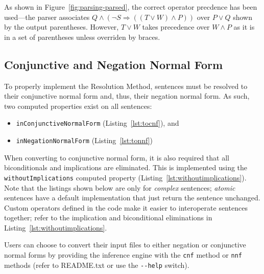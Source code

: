 As shown in Figure~\ref{fig:parsing-parsed}, the correct operator precdence has
been used---the parser associates $Q \wedge (\neg S \Rightarrow ((T \vee W) \wedge P))$
over $P \vee Q$ shown by the output parentheses. However, $T \vee W$ takes
precedence over $W \wedge P$ as it is in a set of parentheses unless overriden by braces.

\subsection{Conjunctive and Negation Normal Form}
\label{subs:CNF}

To properly implement the Resolution Method, sentences must be resolved to their
conjunctive normal form and, thus, their negation normal form. As such, two
computed properties exist on all sentences:

\begin{itemize}
  \item \texttt{inConjunctiveNormalForm} (Listing~\ref{lst:tocnf}), and
  \item \texttt{inNegationNormalForm} (Listing~\ref{lst:tonnf})
\end{itemize}

When converting to conjunctive normal form, it is also required that all biconditionals
and implications are eliminated. This is implemented using the \texttt{withoutImplications}
computed property (Listing~\ref{lst:withoutimplications}). Note that the listings shown below
are only for \emph{complex} sentences; \textit{atomic} sentences have a default
implementation that just return the sentence unchanged. Custom operators defined
in the code make it easier to interoperate sentences together; refer to the implication
and biconditional eliminations in Listing~\ref{lst:withoutimplications}.

Users can choose to convert their input files to either negation or conjunctive
normal forms by providing the inference engine with the \texttt{cnf} method or
\texttt{nnf} methods (refer to README.txt or use the \verb`--help` switch).

